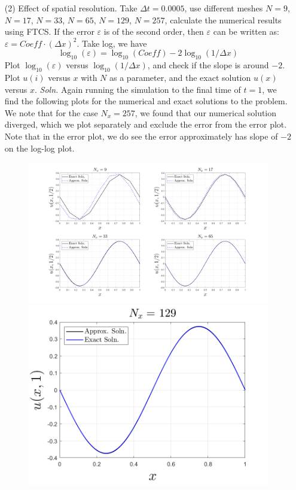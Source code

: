 \documentclass{article}
\begin{document}
\begin{itemize}
\begin{itemize}
        \item[(2)] Effect of spatial resolution. Take $\Delta t = 0.0005$, use different meshes $N = 9$, $N = 17$, $N = 33$, $N = 65$, $N = 129$, $N = 257$, calculate the numerical results using FTCS.
        \newline
        If the error $\varepsilon$ is of the second order, then $\varepsilon$ can be written as: $\varepsilon = Coeff \cdot (\Delta x)^2$. Take log, we have
        \[\log_{10}(\varepsilon) = \log_{10}(Coeff) - 2\log_{10}(1/\Delta x)\]
        Plot $\log_{10}(\varepsilon)$ versus $\log_{10}(1/\Delta x)$, and check if the slope is around $-2$. Plot $u(i)$ versus $x$ with $N$ as a parameter, and the exact solution $u(x)$ versus $x$.
        \newline\newline
        \textit{Soln.} Again running the simulation to the final time of $t = 1$, we find the following plots for the numerical and exact solutions to the problem. We note that for the case $N_x = 257$, we found that our numerical solution diverged, which we plot separately and exclude the error from the error plot. Note that in the error plot, we do see the error approximately has slope of $-2$ on the log-log plot.
        \begin{figure}[H]
            \begin{center}
                \includegraphics[scale = 0.25]{prob_1_2_subplots.png}
                \newline
                \includegraphics[scale = 0.3]{prob_1_2_nx_129.png}

\end{center}
\end{figure}
\end{itemize}
\end{itemize}
\end{document}
